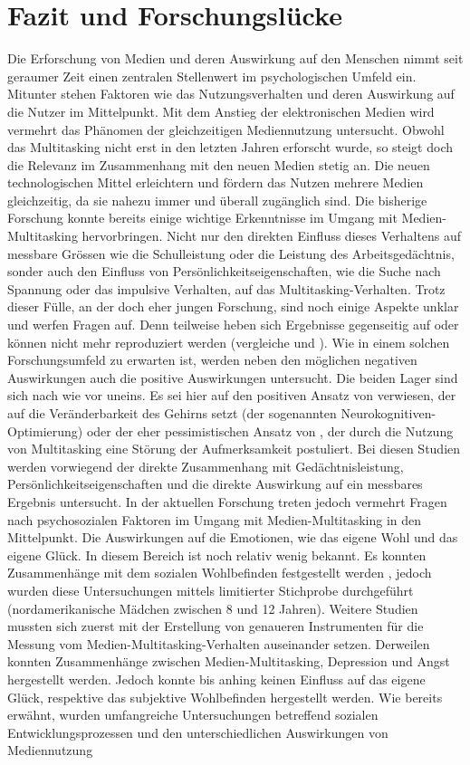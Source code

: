 \section{Fazit und Forschungslücke}\label{section.fazitLücke}
Die Erforschung von Medien und deren Auswirkung auf den Menschen nimmt seit geraumer Zeit einen zentralen Stellenwert im psychologischen Umfeld ein. Mitunter stehen Faktoren wie das Nutzungsverhalten und deren Auswirkung auf die Nutzer im Mittelpunkt. Mit dem Anstieg der elektronischen Medien wird vermehrt das Phänomen der gleichzeitigen Mediennutzung untersucht. Obwohl das Multitasking nicht erst in den letzten Jahren erforscht wurde, so steigt doch die Relevanz im Zusammenhang mit den neuen Medien stetig an. Die neuen technologischen Mittel erleichtern und fördern das Nutzen mehrere Medien gleichzeitig, da sie nahezu immer und überall zugänglich sind. Die bisherige Forschung konnte bereits einige wichtige Erkenntnisse im Umgang mit Medien-Multitasking hervorbringen. Nicht nur den direkten Einfluss dieses Verhaltens auf messbare Grössen wie die Schulleistung oder die Leistung des Arbeitsgedächtnis, sonder auch den Einfluss von Persönlichkeitseigenschaften, wie die Suche nach Spannung oder das impulsive Verhalten, auf das Multitasking-Verhalten. Trotz dieser Fülle, an der doch eher jungen Forschung, sind noch einige Aspekte unklar und werfen Fragen auf. Denn teilweise heben sich Ergebnisse gegenseitig auf oder können nicht mehr reproduziert werden (vergleiche  und ). Wie in einem solchen Forschungsumfeld zu erwarten ist, werden neben den möglichen negativen Auswirkungen auch die positive Auswirkungen untersucht. Die beiden Lager sind sich nach wie vor uneins. Es sei hier auf den positiven Ansatz von  verwiesen, der auf die Veränderbarkeit des Gehirns setzt (der sogenannten Neurokognitiven-Optimierung) oder der eher pessimistischen Ansatz von , der durch die Nutzung von Multitasking eine Störung der Aufmerksamkeit postuliert. Bei diesen Studien werden vorwiegend der direkte Zusammenhang mit Gedächtnisleistung, Persönlichkeitseigenschaften und die direkte Auswirkung auf ein messbares Ergebnis untersucht. In der aktuellen Forschung treten jedoch vermehrt Fragen nach psychosozialen Faktoren im Umgang mit Medien-Multitasking in den Mittelpunkt. Die Auswirkungen auf die Emotionen, wie das eigene Wohl und das eigene Glück. In diesem Bereich ist noch relativ wenig bekannt. Es konnten Zusammenhänge mit dem sozialen Wohlbefinden festgestellt werden , jedoch wurden diese Untersuchungen mittels limitierter Stichprobe durchgeführt (nordamerikanische Mädchen zwischen 8 und 12 Jahren). Weitere Studien mussten sich zuerst mit der Erstellung von genaueren Instrumenten für die Messung vom Medien-Multitasking-Verhalten auseinander setzen. Derweilen konnten Zusammenhänge zwischen Medien-Multitasking, Depression und Angst hergestellt werden. Jedoch konnte bis anhing keinen  Einfluss auf das eigene Glück, respektive das subjektive Wohlbefinden hergestellt werden. Wie bereits  erwähnt, wurden umfangreiche Untersuchungen betreffend sozialen Entwicklungsprozessen und den unterschiedlichen Auswirkungen von Mediennutzung 